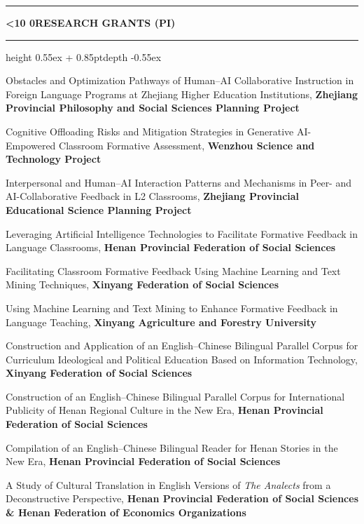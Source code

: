 \documentclass[11pt,a4paper]{article}
\newcommand{\listtabwidth}{1.55cm}
\newcounter{cvsection}
\newcommand{\cvsection}[1]{%
  \Needspace{6\baselineskip}%
  \par\vspace{9pt plus 2pt minus 2pt}%
  \refstepcounter{cvsection}%
  \noindent
  \textcolor{cvaccent}{%
    \rule[0.55ex]{\listtabwidth}{0.85pt}%
    \hspace{0.6em}%
    {\headingfont\bfseries\large\ifnum\value{cvsection}<10 0\fi\arabic{cvsection}\hspace{0.5em}\MakeUppercase{#1}}%
    \hspace{0.6em}%
    \leaders\hrule height \dimexpr 0.55ex + 0.85pt\relax depth -0.55ex\hfill\kern0pt
  }\par
  \nopagebreak
  \vspace{0.22em}%
}
\begin{document}
\cvsection{Research Grants (PI)}

\begin{tablist}[itemsep=0.14em, parsep=0.10em]
\item[2026] Obstacles and Optimization Pathways of Human--AI Collaborative Instruction in Foreign Language Programs at Zhejiang Higher Education Institutions, \textbf{Zhejiang Provincial Philosophy and Social Sciences Planning Project}

\item[2026] Cognitive Offloading Risks and Mitigation Strategies in Generative AI-Empowered Classroom Formative Assessment, \textbf{Wenzhou Science and Technology Project}

\item[2026] Interpersonal and Human--AI Interaction Patterns and Mechanisms in Peer- and AI-Collaborative Feedback in L2 Classrooms, \textbf{Zhejiang Provincial Educational Science Planning Project}

\item[2024] Leveraging Artificial Intelligence Technologies to Facilitate Formative Feedback in Language Classrooms, \textbf{Henan Provincial Federation of Social Sciences}

\item[2024] Facilitating Classroom Formative Feedback Using Machine Learning and Text Mining Techniques, \textbf{Xinyang Federation of Social Sciences}

\item[2022] Using Machine Learning and Text Mining to Enhance Formative Feedback in Language Teaching, \textbf{Xinyang Agriculture and Forestry University}

\item[2021] Construction and Application of an English--Chinese Bilingual Parallel Corpus for Curriculum Ideological and Political Education Based on Information Technology, \textbf{Xinyang Federation of Social Sciences}

\item[2021] Construction of an English--Chinese Bilingual Parallel Corpus for International Publicity of Henan Regional Culture in the New Era, \textbf{Henan Provincial Federation of Social Sciences}

\item[2019] Compilation of an English--Chinese Bilingual Reader for Henan Stories in the New Era, \textbf{Henan Provincial Federation of Social Sciences}

\item[2019] A Study of Cultural Translation in English Versions of \textit{The Analects} from a Deconstructive Perspective, \textbf{Henan Provincial Federation of Social Sciences \& Henan Federation of Economics Organizations}


\end{tablist}
\end{document}
